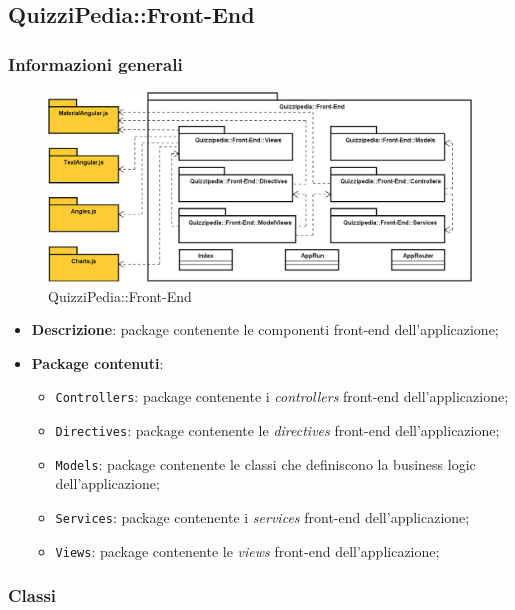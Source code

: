 \subsection{QuizziPedia::Front-End}
\subsubsection{Informazioni generali}
\label{QuizziPedia::Front-End}
\begin{figure}[ht]
	\centering
	\includegraphics[scale=0.35]{UML/Package/QuizziPedia_Front-end.png}
	\caption{QuizziPedia::Front-End}
\end{figure}
\FloatBarrier
	\begin{itemize}
		\item \textbf{Descrizione}: package contenente le componenti front-end dell'applicazione;
		\item \textbf{Package contenuti}:
		\begin{itemize}
			\item \texttt{Controllers}: package contenente i \textit{controllers} front-end dell'applicazione;
			\item \texttt{Directives}: package contenente le \textit{directives} front-end dell'applicazione;
			\item \texttt{Models}: package contenente le classi che definiscono la business logic dell'applicazione;
			\item \texttt{Services}: package contenente i \textit{services} front-end dell'applicazione;
			\item \texttt{Views}: package contenente le \textit{views} front-end dell'applicazione;
		\end{itemize}
	\end{itemize}

\subsubsection{Classi}
	
	
	